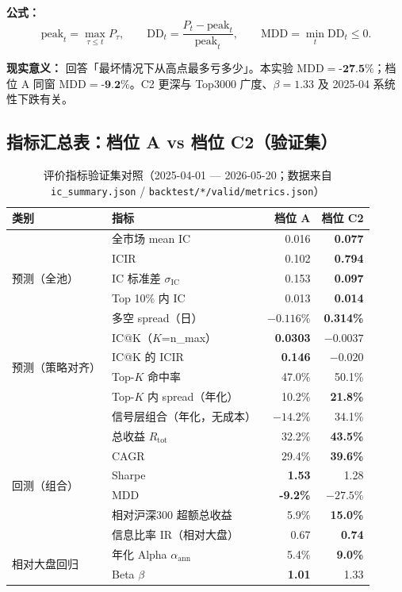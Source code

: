 \documentclass[UTF8,a4paper,12pt]{ctexart}
\begin{document}
\textbf{公式：}
\begin{equation}
  \mathrm{peak}_t = \max_{\tau\le t} P_\tau,
  \qquad
  \mathrm{DD}_t = \frac{P_t - \mathrm{peak}_t}{\mathrm{peak}_t},
  \qquad
  \mathrm{MDD} = \min_t \mathrm{DD}_t \le 0.
\end{equation}

\textbf{现实意义：} 回答「最坏情况下从高点最多亏多少」。本实验 $\mathrm{MDD}=\textbf{-27.5\%}$；档位 A 同窗 $\mathrm{MDD}=\textbf{-9.2\%}$。C2 更深与 Top3000 广度、$\beta=1.33$ 及 2025-04 系统性下跌有关。

\subsection{指标汇总表：档位 A vs 档位 C2（验证集）}

\begin{table}[H]
\centering
\caption{评价指标验证集对照（2025-04-01 --- 2026-05-20；数据来自 \texttt{ic\_summary.json} / \texttt{backtest/*/valid/metrics.json}）}
\label{tab:metrics-ac-c2}
\small
\begin{tabular}{llrr}
\toprule
\textbf{类别} & \textbf{指标} & \textbf{档位 A} & \textbf{档位 C2} \\
\midrule
\multirow{5}{*}{预测（全池）}
  & 全市场 mean IC & 0.016 & \textbf{0.077} \\
  & ICIR & 0.102 & \textbf{0.794} \\
  & IC 标准差 $\sigma_{\mathrm{IC}}$ & 0.153 & \textbf{0.097} \\
  & Top 10\% 内 IC & 0.013 & \textbf{0.014} \\
  & 多空 spread（日） & $-0.116\%$ & \textbf{0.314\%} \\
\midrule
\multirow{4}{*}{预测（策略对齐）}
  & IC@K（$K$=n\_max） & \textbf{0.0303} & $-0.0037$ \\
  & IC@K 的 ICIR & \textbf{0.146} & $-0.020$ \\
  & Top-$K$ 命中率 & 47.0\% & 50.1\% \\
  & Top-$K$ 内 spread（年化） & 10.2\% & \textbf{21.8\%} \\
  & 信号层组合（年化，无成本） & $-14.2\%$ & 34.1\% \\
\midrule
\multirow{6}{*}{回测（组合）}
  & 总收益 $R_{\mathrm{tot}}$ & 32.2\% & \textbf{43.5\%} \\
  & CAGR & 29.4\% & \textbf{39.6\%} \\
  & Sharpe & \textbf{1.53} & 1.28 \\
  & MDD & \textbf{-9.2\%} & $-27.5\%$ \\
  & 相对沪深300 超额总收益 & 5.9\% & \textbf{15.0\%} \\
  & 信息比率 IR（相对大盘） & 0.67 & \textbf{0.74} \\
\midrule
\multirow{2}{*}{相对大盘回归}
  & 年化 Alpha $\alpha_{\mathrm{ann}}$ & 5.4\% & \textbf{9.0\%} \\
  & Beta $\beta$ & \textbf{1.01} & 1.33 \\
\bottomrule
\end{tabular}
\end{table}
\end{document}
